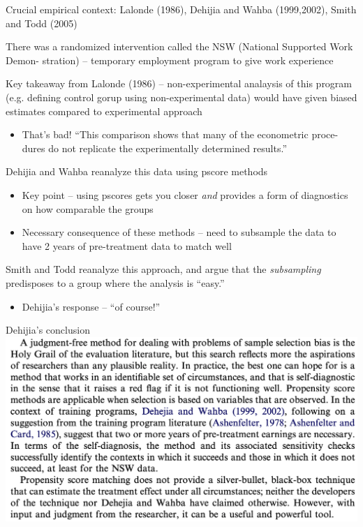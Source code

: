 \documentclass[notes,11pt, aspectratio=169]{beamer}
\newenvironment{wideitemize}{\itemize\addtolength{\itemsep}{10pt}}{\enditemize}
\begin{document}
\begin{frame}{Crucial empirical context: Lalonde (1986), Dehijia and Wahba (1999,2002), Smith and Todd (2005)}
  \begin{wideitemize}
    \item There was a randomized intervention called the NSW (National Supported Work Demon-
      stration) -- temporary employment program to give work experience
    \item Key takeaway from Lalonde (1986) -- non-experimental
      analaysis of this program (e.g. defining control gorup using
      non-experimental data) would have given biased estimates compared to experimental approach
      \begin{itemize}
      \item That's bad! ``This comparison shows that many of the econometric proce-
 dures do not replicate the experimentally determined results.''
      \end{itemize}
    \item Dehijia and Wahba reanalyze this data using pscore methods
      \begin{itemize}
      \item Key point -- using pscores gets you closer \emph{and}
        provides a form of diagnostics on how comparable the groups
      \item Necessary consequence of these methods -- need to
        subsample the data to have 2 years of pre-treatment data to
        match well
      \end{itemize}
    \item Smith and Todd reanalyze this approach, and argue that the
      \emph{subsampling} predisposes to a group where the analysis is ``easy.''
      \begin{itemize}
      \item Dehijia's response -- ``of course!''
      \end{itemize}
      
  \end{wideitemize}
  
\end{frame}

\begin{frame}{Dehijia's conclusion}
\includegraphics[width=0.7\linewidth]{images/dehijia1.png}
\end{frame}
\end{document}
